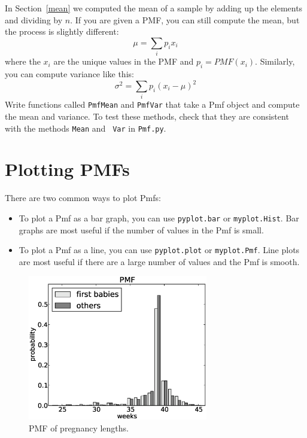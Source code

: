 \documentclass[12pt]{book}
\begin{document}
\begin{exercise}
%
%
In Section~\ref{mean} we computed the mean of a sample by adding up
the elements and dividing by $n$.  If you are given a PMF, you can
still compute the mean, but the process is slightly different:
%
\[ \mu = \sum_i p_i x_i \]
%
where the $x_i$ are the unique values in the PMF and $p_i = PMF(x_i)$.
Similarly, you can compute variance like this:
%
\[ \sigma^2 = \sum_i p_i (x_i - \mu)^2\]
% 
Write functions called {\tt PmfMean} and {\tt PmfVar} that take a
Pmf object and compute the mean and variance.  To test these methods,
check that they are consistent with the methods {\tt Mean} and {\tt
  Var} in {\tt Pmf.py}.


\end{exercise}




\section{Plotting PMFs}


There are two common ways to plot Pmfs:

\begin{itemize}

\item To plot a Pmf as a bar graph, you can use {\tt pyplot.bar}
or {\tt myplot.Hist}.  Bar graphs are most useful if the number
of values in the Pmf is small.


\item To plot a Pmf as a line, you can use {\tt pyplot.plot}
or {\tt myplot.Pmf}.  Line plots are most useful if there are
a large number of values and the Pmf is smooth.


\end{itemize}

\begin{figure}
\centerline{\includegraphics[height=2.5in]{figs/nsfg_pmf.eps}}
\caption{PMF of pregnancy lengths.}
\label{nsfg_pmf}
\end{figure}
\end{document}
